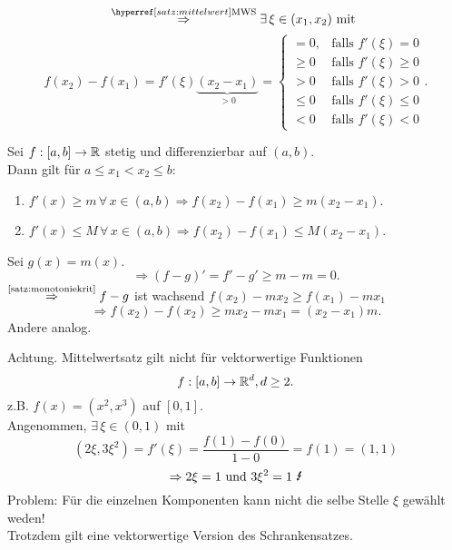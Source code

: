 \documentclass[../ana1.tex]{subfiles}
\begin{document}
\begin{bew}
    \[ \overref{satz:mittelwert}{MWS}{\Rightarrow} \exists \, 
    \xi \in (x_1, x_2) \text{ mit } \]
    \[ f(x_2) - f(x_1) = f'(\xi) \underbrace{(x_2 - x_1)}_{>0}
    = \begin{cases}
        =0, & \text{falls } f'(\xi) = 0\\
        \geq 0 &\text{falls } f'(\xi) \geq 0\\
        > 0 &\text{falls } f'(\xi) > 0\\
        \leq 0 &\text{falls } f'(\xi) \leq 0\\
        < 0 &\text{falls } f'(\xi) < 0
    \end{cases}. \]
\end{bew}
\begin{kor}[Schrankensatz]
    Sei \( f: [a,b] \rightarrow \mathbb{R} \) stetig und differenzierbar 
    auf \( (a,b) \).\\
    Dann gilt für \( a \leq x_1 < x_2 \leq b \): 
    \begin{enumerate}
        \item \( f'(x) \geq m \,\forall \, x \in (a,b) 
        \Rightarrow f(x_2) - f(x_1) \geq m(x_2 - x_1) \).
        \item \( f'(x) \leq M \, \forall \, x\in (a,b) 
        \Rightarrow f(x_2) - f(x_1) \leq M(x_2 - x_1) \).
    \end{enumerate}
\end{kor}
\begin{bew}
    Sei \( g(x) = m(x) \).
    \[ \Rightarrow (f - g)' = f' - g' \geq m - m = 0. \]
    \( \oversett{\autoref{satz:monotoniekrit}}{\Rightarrow} 
    f - g \) ist wachsend \dphp{} \( f(x_2) - m x_2 \geq 
    f(x_1) - m x_1 \) 
    \[ \Rightarrow f(x_2) - f(x_2) \geq m x_2 - m x_1 
    = (x_2 - x_1)m. \]
    Andere analog.
\end{bew}
\begin{bsp}%
    Achtung. Mittelwertsatz gilt nicht für 
    vektorwertige Funktionen
    \[ f: [a,b] \rightarrow \mathbb{R}^d, d \geq 2. \]
    z.B. \( f(x) = (x^2,x^3) \) auf \( [0,1] \). \\
    Angenommen, \( \exists \, \xi \in (0,1) \) mit 
    \[ (2\xi, 3\xi^2) = f'(\xi) = \frac{f(1) - f(0)}{1-0} 
    = f(1) = (1,1) \]
    \[ \Rightarrow 2\xi = 1 \text{ und } 3\xi^2 = 1 \text{ \Lightning{}} \]
    Problem: Für die einzelnen Komponenten kann nicht die selbe Stelle 
    \( \xi \) gewählt weden!\\
    Trotzdem gilt eine vektorwertige Version des Schrankensatzes.    
\end{bsp}
\end{document}
